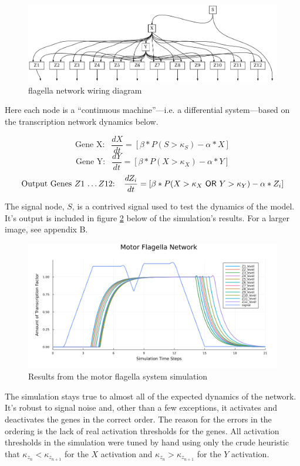 \documentclass[12pt]{article}
\begin{document}
\begin{figure}[h]
    \centering
    \includegraphics*[scale=0.5]{motor_flagella_network.png}
    \caption{flagella network wiring diagram}
    \label{fig:flagella network}
\end{figure}


Here each node is a ``continuous machine''---i.e. a differential system---based on the transcription network dynamics below.

$$\text{Gene X: } \ \ \frac{dX}{dt} = [\beta*P(S > \kappa_S) - \alpha * X]$$
$$\text{Gene Y: } \ \ \frac{dY}{dt} = [\beta*P(X > \kappa_X) - \alpha * Y]$$
$$\text{Output Genes $Z1$ \dots $Z12$: } \ \ \frac{dZ_i}{dt} = [\beta*P(X > \kappa_X \ \mathsf{OR} \ Y > \kappa_Y) - \alpha * Z_i]$$

The signal node, $S$, is a contrived signal used to test the dynamics of the model.
It's output is included in figure \ref{fig:simulation_results} below of the simulation's results.
For a larger image, see appendix B.
\begin{figure}[h]
    \centering
    \includegraphics*[scale=0.6]{motor_flagella.png}
    \caption{Results from the motor flagella system simulation}
    \label{fig:simulation_results}
\end{figure}


The simulation stays true to almost all of the expected dynamics of the network.
It's robust to signal noise and, other than a few exceptions, it activates and deactivates the genes in the correct order.
The reason for the errors in the ordering is the lack of real activation thresholds for the genes.
All activation thresholds in the simulation were tuned by hand using only the crude heuristic that $\kappa_{z_n} < \kappa_{z_{n+1}}$ for the $X$ activation and $\kappa_{z_n} > \kappa_{z_{n+1}}$ for the $Y$ activation.
\end{document}
